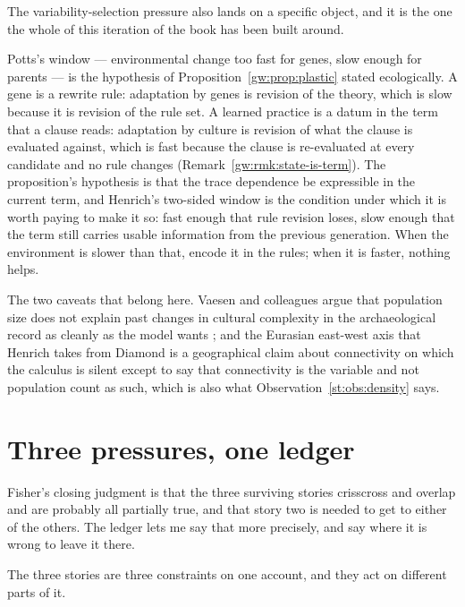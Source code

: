 \noindent
The variability-selection pressure also lands on a specific object, and it is the one the whole of this iteration of the book has been built around.

\begin{observation}
\label{st:obs:variability}
Potts's window --- environmental change too fast for genes, slow enough for parents --- is the hypothesis of Proposition~\ref{gw:prop:plastic} stated ecologically. A gene is a rewrite rule: adaptation by genes is revision of the theory, which is slow because it is revision of the rule set. A learned practice is a datum in the term that a clause reads: adaptation by culture is revision of what the clause is evaluated against, which is fast because the clause is re-evaluated at every candidate and no rule changes (Remark~\ref{gw:rmk:state-is-term}). The proposition's hypothesis is that the trace dependence be expressible in the current term, and Henrich's two-sided window is the condition under which it is worth paying to make it so: fast enough that rule revision loses, slow enough that the term still carries usable information from the previous generation. When the environment is slower than that, encode it in the rules; when it is faster, nothing helps.
\end{observation}

\noindent
The two caveats that belong here. Vaesen and colleagues argue that population size does not explain past changes in cultural complexity in the archaeological record as cleanly as the model wants \cite{vaesen2016}; and the Eurasian east-west axis that Henrich takes from Diamond \cite{diamond1997} is a geographical claim about connectivity on which the calculus is silent except to say that connectivity is the variable and not population count as such, which is also what Observation~\ref{st:obs:density} says.

\section{Three pressures, one ledger}
\label{st:sec:ledger}

Fisher's closing judgment is that the three surviving stories crisscross and overlap and are probably all partially true, and that story two is needed to get to either of the others. The ledger lets me say that more precisely, and say where it is wrong to leave it there.

The three stories are three constraints on one account, and they act on different parts of it.

